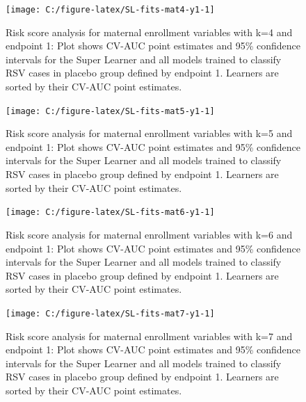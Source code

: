 \documentclass[11pt]{article}
\begin{document}
\begin{figure}[H]

{\centering \texttt{[image: C:/figure-latex/SL-fits-mat4-y1-1]} 

}

\caption[Risk score analysis for maternal enrollment variables with k=4 and endpoint 1.]{Risk score analysis for maternal enrollment variables with k=4 and endpoint 1: Plot shows CV-AUC point estimates and 95\% confidence intervals for the Super Learner and all models trained to classify RSV cases in placebo group defined by endpoint 1. Learners are sorted by their CV-AUC point estimates.}\label{fig:SL-fits-mat4-y1}
\end{figure}

\begin{figure}[H]

{\centering \texttt{[image: C:/figure-latex/SL-fits-mat5-y1-1]} 

}

\caption[Risk score analysis for maternal enrollment variables with k=5 and endpoint 1.]{Risk score analysis for maternal enrollment variables with k=5 and endpoint 1: Plot shows CV-AUC point estimates and 95\% confidence intervals for the Super Learner and all models trained to classify RSV cases in placebo group defined by endpoint 1. Learners are sorted by their CV-AUC point estimates.}\label{fig:SL-fits-mat5-y1}
\end{figure}

\begin{figure}[H]

{\centering \texttt{[image: C:/figure-latex/SL-fits-mat6-y1-1]} 

}

\caption[Risk score analysis for maternal enrollment variables with k=6 and endpoint 1.]{Risk score analysis for maternal enrollment variables with k=6 and endpoint 1: Plot shows CV-AUC point estimates and 95\% confidence intervals for the Super Learner and all models trained to classify RSV cases in placebo group defined by endpoint 1. Learners are sorted by their CV-AUC point estimates.}\label{fig:SL-fits-mat6-y1}
\end{figure}

\begin{figure}[H]

{\centering \texttt{[image: C:/figure-latex/SL-fits-mat7-y1-1]} 

}

\caption[Risk score analysis for maternal enrollment variables with k=7 and endpoint 1.]{Risk score analysis for maternal enrollment variables with k=7 and endpoint 1: Plot shows CV-AUC point estimates and 95\% confidence intervals for the Super Learner and all models trained to classify RSV cases in placebo group defined by endpoint 1. Learners are sorted by their CV-AUC point estimates.}\label{fig:SL-fits-mat7-y1}
\end{figure}
\end{document}

